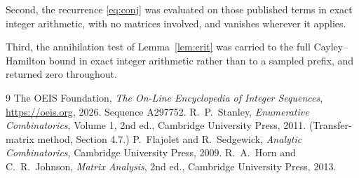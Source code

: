 \documentclass[11pt,a4paper]{article}
\theoremstyle{plain}
\theoremstyle{definition}
\begin{document}
Second, the recurrence \eqref{eq:conj} was evaluated on those published terms in exact
integer arithmetic, with no matrices involved, and vanishes wherever it applies.

Third, the annihilation test of Lemma~\ref{lem:crit} was carried to the full
Cayley--Hamilton bound in exact integer arithmetic rather than to a sampled prefix, and
returned zero throughout.

\begin{thebibliography}{9}
 The OEIS Foundation, \emph{The On-Line Encyclopedia of Integer
Sequences}, \url{https://oeis.org}, 2026. Sequence A297752.
 R.~P.~Stanley, \emph{Enumerative Combinatorics}, Volume 1, 2nd ed.,
Cambridge University Press, 2011. (Transfer-matrix method, Section 4.7.)
 P.~Flajolet and R.~Sedgewick, \emph{Analytic Combinatorics}, Cambridge
University Press, 2009.
 R.~A.~Horn and C.~R.~Johnson, \emph{Matrix Analysis}, 2nd ed., Cambridge
University Press, 2013.
\end{thebibliography}
\end{document}
